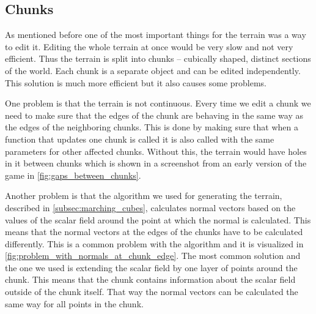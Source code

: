 \subsection{Chunks}
As mentioned before one of the most important things for the terrain was a way to edit it.
Editing the whole terrain at once would be very slow and not very efficient.
Thus the terrain is split into chunks -- cubically shaped, distinct sections of the world.
Each chunk is a separate object and can be edited independently.
This solution is much more efficient but it also causes some problems.

One problem is that the terrain is not continuous.
Every time we edit a chunk we need to make sure that the edges of the chunk are behaving in the same way as the edges of the neighboring chunks.
This is done by making sure that when a function that updates one chunk is called it is also called with the same parameters for other affected chunks.
Without this, the terrain would have holes in it between chunks which is shown in a screenshot from an early version of the game in \autoref{fig:gaps_between_chunks}.

Another problem is that the algorithm we used for generating the terrain, described in \autoref{subsec:marching_cubes}, calculates normal vectors based on the values of the scalar field around the point at which the normal is calculated.
This means that the normal vectors at the edges of the chunks have to be calculated differently.
This is a common problem with the algorithm and it is visualized in \autoref{fig:problem_with_normals_at_chunk_edge}.
The most common solution and the one we used is extending the scalar field by one layer of points around the chunk.
This means that the chunk contains information about the scalar field outside of the chunk itself.
That way the normal vectors can be calculated the same way for all points in the chunk.

